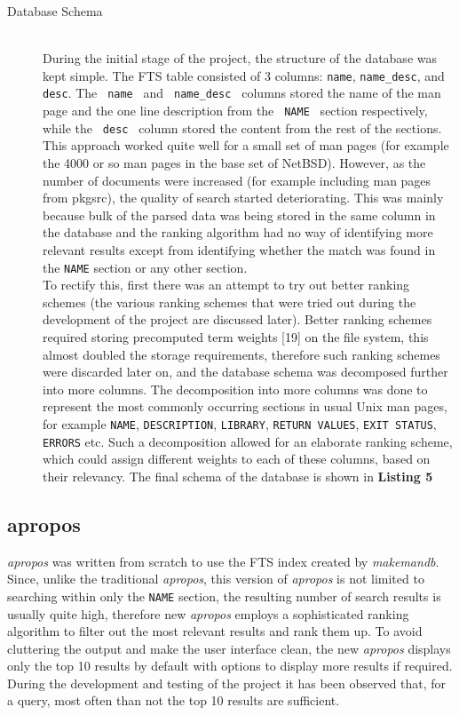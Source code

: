 \documentclass[letterpaper,twocolumn,10pt]{article}
\begin{document}
\begin{description}
\item[Database Schema] \hfill \\
During the initial stage of the project, the structure of the database was kept
simple. The FTS table consisted of 3 columns:
{\tt name}, {\tt name\_desc}, and {\tt desc}.
The
{\tt
name
}
and
{\tt
name\_desc
}
columns stored the name of the man page and the one line description from the
{\tt
NAME
}
section respectively, while the
{\tt
desc
}
column stored the content from the rest of the sections. This approach worked
quite well for a small set of man pages (for example the 4000 or so man pages in
the base set of NetBSD). However, as the number of documents were increased (for example including man pages from pkgsrc), the quality of search started deteriorating. This was mainly because bulk of the parsed data was being stored
in the same column in the database and the ranking algorithm had no way of
identifying more relevant results except from identifying whether the match was found in the {\tt NAME} section or any other section. \\

To rectify this, first there was an attempt to try out better ranking schemes
(the various ranking schemes that were tried out during the development of the
project are discussed later). Better ranking schemes required storing precomputed
term weights [19] on the file system, this almost doubled the storage requirements, therefore such ranking schemes were discarded later on, and the
database schema was decomposed further into more columns. The decomposition into
more columns was done to represent the most commonly occurring sections in usual Unix man pages, for example
{\tt NAME}, {\tt DESCRIPTION}, {\tt LIBRARY}, {\tt RETURN VALUES},
{\tt EXIT STATUS}, {\tt ERRORS}
etc. Such a decomposition allowed for an elaborate ranking scheme, which could
assign different weights to each of these columns, based on their relevancy. The
final schema of the database is shown in {\bf Listing 5}
\end{description}

\subsection{apropos}
\textit{apropos} was written from scratch to use the FTS index created by
\textit{makemandb}. Since, unlike the traditional \textit{apropos}, this version
of \textit{apropos} is not limited to searching within only the {\tt NAME}
section, the resulting
number of search results is usually quite high, therefore new \textit{apropos}
employs a
sophisticated ranking algorithm to filter out the most relevant results and rank
them up. To avoid cluttering the output and make the user interface clean, the
new \textit{apropos} displays only the top 10 results by default with options
to display more results if required. During the development and testing of the
project it has been observed that, for a query, most often than not the top 10
results are sufficient. \\
\end{document}
